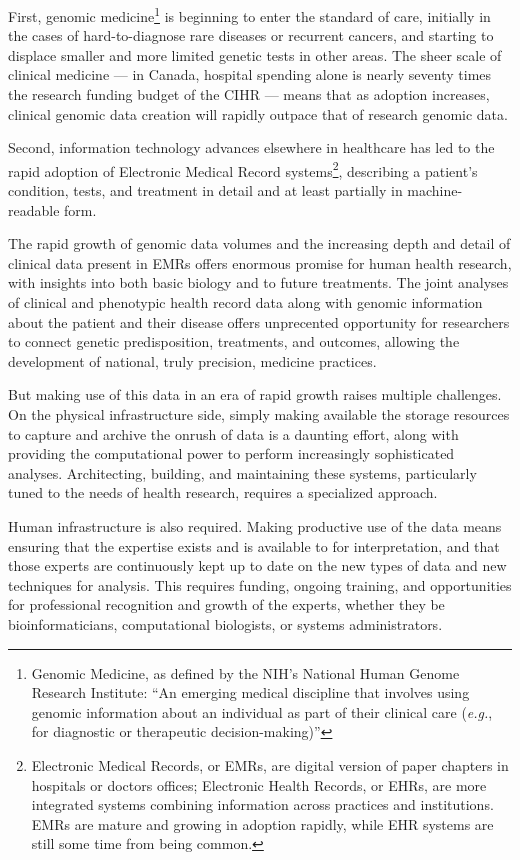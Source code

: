 \documentclass[twoside,symmetric,sfsidenotes,notoc]{tufte-book}
\begin{document}
First, genomic medicine\footnote{Genomic Medicine, as defined by the NIH's
National Human Genome Research Institute: ``An emerging medical discipline
that involves using genomic information about an individual as part of their
clinical care (\textit{e.g.}, for diagnostic or therapeutic decision-making)''} is beginning
to enter the standard of care, initially in the cases of hard-to-diagnose
rare diseases or recurrent cancers, and starting to displace smaller
and more limited genetic tests in other areas.  The sheer scale of clinical medicine 
--- in Canada, hospital spending alone is nearly seventy times the research funding
budget of the CIHR --- means that as adoption increases, clinical
genomic data creation will rapidly outpace that of research genomic data.

Second, information technology advances elsewhere in healthcare
has led to the rapid adoption of Electronic Medical Record systems\footnote{
Electronic Medical Records, or EMRs, are digital version of paper chapters
in hospitals or doctors offices; Electronic Health Records, or EHRs, are
more integrated systems combining information across practices and institutions.
EMRs are mature and growing in adoption rapidly, while EHR systems are still
some time from being common.}, describing a patient's condition, tests, and
treatment in detail and at least partially in machine-readable form.

The rapid growth of genomic data volumes and the increasing depth and detail
of clinical data present in EMRs offers enormous promise for human health research,
with insights into both basic biology and to future treatments.  The joint analyses
of clinical and phenotypic health record data along with genomic information 
about the patient and their disease offers unprecented opportunity for researchers
to connect genetic predisposition, treatments, and outcomes, allowing the
development of national, truly precision, medicine practices.

But making use of this data in an era of rapid growth raises multiple challenges.
On the physical infrastructure side, simply making available the storage 
resources to capture and archive the onrush of data is a daunting effort, along with
providing the computational power to perform increasingly sophisticated analyses.
Architecting, building, and maintaining these systems, particularly tuned to
the needs of health research, requires a specialized approach.

Human infrastructure is also required.  Making productive use of the 
data means ensuring that the expertise exists and is available to for interpretation,
and that those experts are continuously kept up to date on the new types of data
and new techniques for analysis.  This requires funding, ongoing training,
and opportunities for professional recognition and growth of the experts, whether
they be bioinformaticians, computational biologists, or systems administrators.
\end{document}
